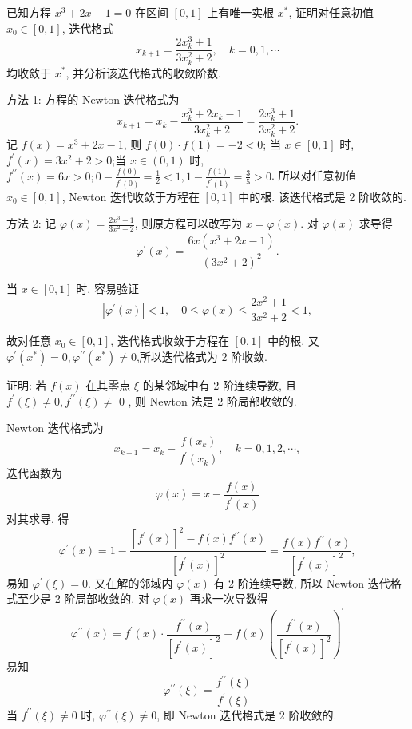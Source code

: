 \begin{tcolorbox}[enhanced,colback=8,colframe=7,breakable,coltitle=green!25!black,title=2024]

已知方程 $ x^{3}+2 x-1=0 $ 在区间 $ [0,1] $ 上有唯一实根 $ x^{*} $, 证明对任意初值 $ x_{0} \in[0,1] $, 迭代格式
$$
x_{k+1}=\frac{2 x_{k}^{3}+1}{3 x_{k}^{2}+2}, \quad k=0,1, \cdots
$$
均收敛于 $ x^{*} $, 并分析该迭代格式的收敛阶数.

 \tcblower
 方法 1: 方程的 Newton 迭代格式为
$$
x_{k+1}=x_{k}-\frac{x_{k}^{3}+2 x_{k}-1}{3 x_{k}^{2}+2}=\frac{2 x_{k}^{3}+1}{3 x_{k}^{2}+2} .
$$
记 $ f(x)=x^{3}+2 x-1 $, 则 $ f(0) \cdot f(1)=-2<0 $; 当 $ x \in[0,1] $ 时, $ f^{\prime}(x)=3 x^{2}+2>0 $;当 $ x \in(0,1) $ 时, $ f^{\prime \prime}(x)=6 x>0 ; 0-\frac{f(0)}{f^{\prime}(0)}=\frac{1}{2}<1,1-\frac{f(1)}{f^{\prime}(1)}=\frac{3}{5}>0 $. 所以对任意初值 $ x_{0} \in[0,1] $, Newton 迭代收敛于方程在 $ [0,1] $ 中的根. 该迭代格式是 2 阶收敛的.

方法 2: 记 $ \varphi(x)=\frac{2 x^{3}+1}{3 x^{2}+2} $, 则原方程可以改写为 $ x=\varphi(x) $. 对 $ \varphi(x) $ 求导得
$$
\varphi^{\prime}(x)=\frac{6 x\left(x^{3}+2 x-1\right)}{\left(3 x^{2}+2\right)^{2}} .
$$

当 $ x \in[0,1] $ 时, 容易验证
$$
\left|\varphi^{\prime}(x)\right|<1, \quad 0 \leqslant \varphi(x) \leqslant \frac{2 x^{2}+1}{3 x^{2}+2}<1,
$$

故对任意 $ x_{0} \in[0,1] $, 迭代格式收敛于方程在 $ [0,1] $ 中的根. 又 $ \varphi^{\prime}\left(x^{*}\right)=0, \varphi^{\prime \prime}\left(x^{*}\right) \neq 0 $,所以迭代格式为 2 阶收敛.
 \end{tcolorbox}

\begin{tcolorbox}[enhanced,colback=8,colframe=7,breakable,coltitle=green!25!black,title=2024]
 证明: 若 $ f(x) $ 在其零点 $ \xi $ 的某邻域中有 2 阶连续导数, 且 $ f^{\prime}(\xi) \neq 0, f^{\prime \prime}(\xi) \neq $ 0 , 则 Newton 法是 2 阶局部收敛的.
\tcblower

Newton 迭代格式为
$$
x_{k+1}=x_{k}-\frac{f\left(x_{k}\right)}{f^{\prime}\left(x_{k}\right)}, \quad k=0,1,2, \cdots,
$$
迭代函数为
$$
\varphi(x)=x-\frac{f(x)}{f^{\prime}(x)}
$$
对其求导, 得
$$
\varphi^{\prime}(x)=1-\frac{\left[f^{\prime}(x)\right]^{2}-f(x) f^{\prime \prime}(x)}{\left[f^{\prime}(x)\right]^{2}}=\frac{f(x) f^{\prime \prime}(x)}{\left[f^{\prime}(x)\right]^{2}},
$$
易知 $ \varphi^{\prime}(\xi)=0 $. 又在解的邻域内 $ \varphi(x) $ 有 2 阶连续导数, 所以 Newton 迭代格式至少是 2 阶局部收敛的.
对 $ \varphi(x) $ 再求一次导数得
$$
\varphi^{\prime \prime}(x)=f^{\prime}(x) \cdot \frac{f^{\prime \prime}(x)}{\left[f^{\prime}(x)\right]^{2}}+f(x)\left(\frac{f^{\prime \prime}(x)}{\left[f^{\prime}(x)\right]^{2}}\right)^{\prime}
$$
易知
$$
\varphi^{\prime \prime}(\xi)=\frac{f^{\prime \prime}(\xi)}{f^{\prime}(\xi)}
$$
当 $ f^{\prime \prime}(\xi) \neq 0 $ 时, $ \varphi^{\prime \prime}(\xi) \neq 0 $, 即 Newton 迭代格式是 2 阶收敛的.
\end{tcolorbox}


